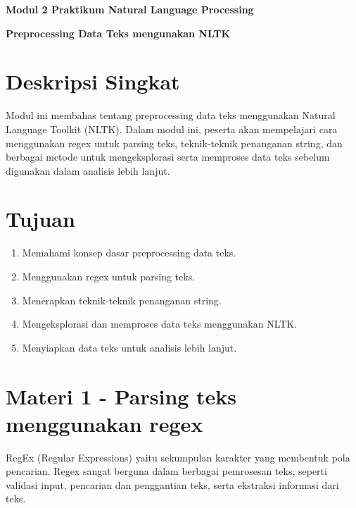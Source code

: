 \documentclass{article}
\begin{document}
    \begin{center}
        \textbf{Modul 2 Praktikum Natural Language Processing}

        \textbf{Preprocessing Data Teks mengunakan NLTK}
    \end{center}

    \section*{Deskripsi Singkat}
    Modul ini membahas tentang preprocessing data teks menggunakan Natural Language Toolkit (NLTK). 
    Dalam modul ini, peserta akan mempelajari cara menggunakan regex untuk parsing teks, teknik-teknik penanganan string, dan berbagai metode untuk mengeksplorasi serta memproses data teks sebelum digunakan dalam analisis lebih lanjut.

    \section*{Tujuan}
    \begin{enumerate}
        \item Memahami konsep dasar preprocessing data teks.
        \item Menggunakan regex untuk parsing teks.
        \item Menerapkan teknik-teknik penanganan string.
        \item Mengeksplorasi dan memproses data teks menggunakan NLTK\@.
        \item Menyiapkan data teks untuk analisis lebih lanjut.
    \end{enumerate}

    \section*{Materi 1 \@- Parsing teks menggunakan regex}
    
    RegEx (Regular Expressions) yaitu sekumpulan karakter yang membentuk pola pencarian.
    Regex sangat berguna dalam berbagai pemrosesan teks, seperti validasi input, pencarian dan penggantian teks, serta ekstraksi informasi dari teks.
\end{document}
